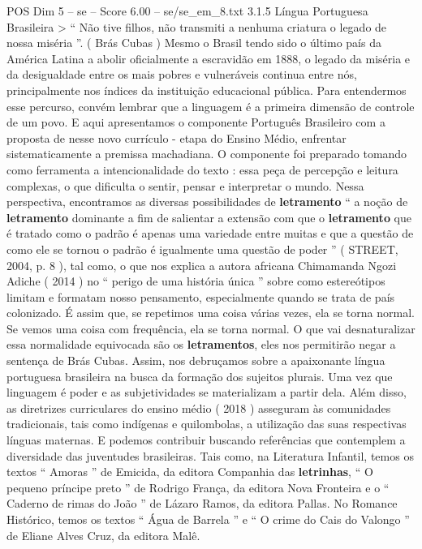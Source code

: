 \begin{textsample}{POS Dim 5 – se – Score 6.00 – se/se\_em\_8.txt}  \label{ex:f5_pos_136}
3.1.5 Língua Portuguesa Brasileira > “ Não tive filhos, não transmiti a nenhuma criatura o legado de nossa miséria ”. ( Brás Cubas ) Mesmo o Brasil tendo sido o último país da América Latina a abolir oficialmente a escravidão em 1888, o legado da miséria e da desigualdade entre os mais pobres e vulneráveis continua entre nós, principalmente nos índices da instituição educacional pública.
Para entendermos esse percurso, convém lembrar que a linguagem é a primeira dimensão de controle de um povo.
E aqui apresentamos o componente Português Brasileiro com a proposta de nesse novo currículo - etapa do Ensino Médio, enfrentar sistematicamente a premissa machadiana.
O componente foi preparado tomando como ferramenta a intencionalidade do texto : essa peça de percepção e leitura complexas, o que dificulta o sentir, pensar e interpretar o mundo.
Nessa perspectiva, encontramos as diversas possibilidades de \textbf{letramento} “ a noção de \textbf{letramento} dominante a fim de salientar a extensão com que o \textbf{letramento} que é tratado como o padrão é apenas uma variedade entre muitas e que a questão de como ele se tornou o padrão é igualmente uma questão de poder ” ( STREET, 2004, p. 8 ), tal como, o que nos explica a autora africana Chimamanda Ngozi Adiche ( 2014 ) no “ perigo de uma história única ” sobre como estereótipos limitam e formatam nosso pensamento, especialmente quando se trata de país colonizado.
É assim que, se repetimos uma coisa várias vezes, ela se torna normal.
Se vemos uma coisa com frequência, ela se torna normal.
O que vai desnaturalizar essa normalidade equivocada são os \textbf{letramentos}, eles nos permitirão negar a sentença de Brás Cubas.
Assim, nos debruçamos sobre a apaixonante língua portuguesa brasileira na busca da formação dos sujeitos plurais.
Uma vez que linguagem é poder e as subjetividades se materializam a partir dela.
Além disso, as diretrizes curriculares do ensino médio ( 2018 ) asseguram às comunidades tradicionais, tais como indígenas e quilombolas, a utilização das suas respectivas línguas maternas.
E podemos contribuir buscando referências que contemplem a diversidade das juventudes brasileiras.
Tais como, na Literatura Infantil, temos os textos “ Amoras ” de Emicida, da editora Companhia das \textbf{letrinhas}, “ O pequeno príncipe preto ” de Rodrigo França, da editora Nova Fronteira e o “ Caderno de rimas do João ” de Lázaro Ramos, da editora Pallas.
No Romance Histórico, temos os textos “ Água de Barrela ” e “ O crime do Cais do Valongo ” de Eliane Alves Cruz, da editora Malê.

\end{textsample}
